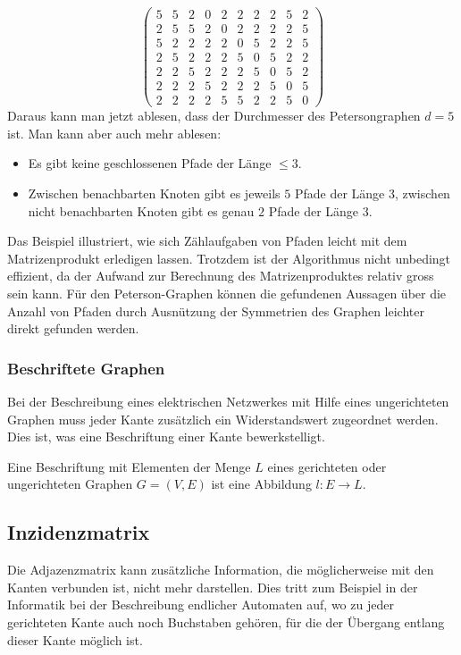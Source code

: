 \begin{beispiel}
\[\begin{pmatrix}
 5& 5& 2& 0& 2& 2& 2& 2& 5& 2\\
 2& 5& 5& 2& 0& 2& 2& 2& 2& 5\\
 5& 2& 2& 2& 2& 0& 5& 2& 2& 5\\
 2& 5& 2& 2& 2& 5& 0& 5& 2& 2\\
 2& 2& 5& 2& 2& 2& 5& 0& 5& 2\\
 2& 2& 2& 5& 2& 2& 2& 5& 0& 5\\
 2& 2& 2& 2& 5& 5& 2& 2& 5& 0
\end{pmatrix}
\]
Daraus kann man jetzt ablesen, dass der Durchmesser des Petersongraphen
$d=5$ ist.
Man kann aber auch mehr ablesen:
\begin{itemize}
\item
Es gibt keine geschlossenen Pfade der Länge $\le 3$.
\item
Zwischen benachbarten Knoten gibt es jeweils $5$ Pfade der Länge $3$,
zwischen nicht benachbarten Knoten gibt es genau $2$ Pfade der Länge $3$.
\qedhere
\end{itemize}
\end{beispiel}

Das Beispiel illustriert, wie sich Zählaufgaben von Pfaden leicht mit dem
Matrizenprodukt erledigen lassen.
Trotzdem ist der Algorithmus nicht unbedingt effizient, da der Aufwand
zur Berechnung des Matrizenproduktes relativ gross sein kann.
Für den Peterson-Graphen können die gefundenen Aussagen über die Anzahl
von Pfaden durch Ausnützung der Symmetrien des Graphen leichter direkt
gefunden werden.

\subsubsection{Beschriftete Graphen}
Bei der Beschreibung eines elektrischen Netzwerkes mit Hilfe eines
ungerichteten Graphen muss jeder Kante zusätzlich ein Widerstandswert
zugeordnet werden.
Dies ist, was eine Beschriftung einer Kante bewerkstelligt.

\begin{definition}
Eine Beschriftung mit Elementen der Menge $L$
eines gerichteten oder ungerichteten Graphen $G=(V,E)$ 
ist eine Abbildung $l\colon E\to L$.
\end{definition}

\subsection{Inzidenzmatrix}
Die Adjazenzmatrix kann zusätzliche Information, die möglicherweise
mit den Kanten verbunden ist, nicht mehr darstellen.
Dies tritt zum Beispiel in der Informatik bei der Beschreibung
endlicher Automaten auf, wo zu jeder gerichteten Kante auch noch
Buchstaben gehören, für die der Übergang entlang dieser Kante
möglich ist.

